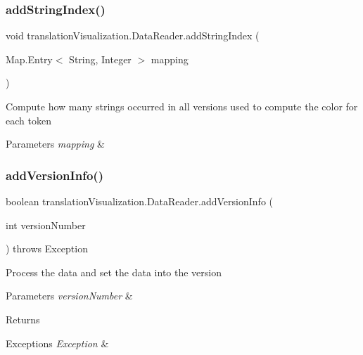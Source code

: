 \subsubsection{\texorpdfstring{add\+String\+Index()}{addStringIndex()}}
{\footnotesize\ttfamily void translation\+Visualization.\+Data\+Reader.\+add\+String\+Index (\begin{DoxyParamCaption}\item[{Map.\+Entry$<$ String, Integer $>$}]{mapping }\end{DoxyParamCaption})\hspace{0.3cm}{\ttfamily [inline]}}

Compute how many strings occurred in all versions used to compute the color for each token 
\begin{DoxyParams}{Parameters}
{\em mapping} & \\
\hline
\end{DoxyParams}
\mbox{\label{classtranslation_visualization_1_1_data_reader_a17eeaa7ca486fbfa82cf52436c60c0bd}} 
\subsubsection{\texorpdfstring{add\+Version\+Info()}{addVersionInfo()}}
{\footnotesize\ttfamily boolean translation\+Visualization.\+Data\+Reader.\+add\+Version\+Info (\begin{DoxyParamCaption}\item[{int}]{version\+Number }\end{DoxyParamCaption}) throws Exception\hspace{0.3cm}{\ttfamily [inline]}}

Process the data and set the data into the version 
\begin{DoxyParams}{Parameters}
{\em version\+Number} & \\
\hline
\end{DoxyParams}
\begin{DoxyReturn}{Returns}

\end{DoxyReturn}

\begin{DoxyExceptions}{Exceptions}
{\em Exception} & \\
\hline
\end{DoxyExceptions}
\mbox{\label{classtranslation_visualization_1_1_data_reader_adcaa3aa9ce1e79118983f153abf8b12d}} 
